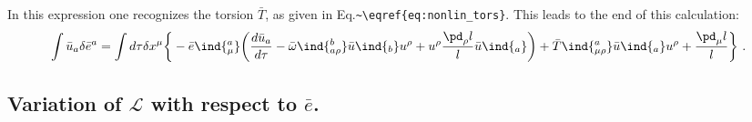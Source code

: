 \documentclass[11pt]{article}
\begin{document}
In this expression one recognizes the torsion $\bar{T}$, as given 
in Eq.\verb+~\eqref{eq:nonlin_tors}+. This leads to the end of 
this calculation:
\begin{equation}
	\int \bar{u}_a \delta\bar{e}^a = \int d\tau \delta x^\mu 
	\bigg\{ - \bar{e}\ind{^a_\mu} \bigg( \frac{d\bar{u}_a}{d\tau} 
	- \bar{\omega}\ind{^b_{a\rho}} \bar{u}\ind{_b} u^\rho + u^\rho 
	\frac{\pd_\rho l}{l} \bar{u}\ind{_a} \bigg) + 
	\bar{T}\ind{^a_{\mu\rho}} \bar{u}\ind{_a} u^\rho + 
	\frac{\pd_\mu l}{l} \bigg\}~.
\end{equation}



\subsection{Variation of $\mathcal{L}$ with respect to 
	$\bar{e}$.}
\label{app:field_eqs}
\end{document}

